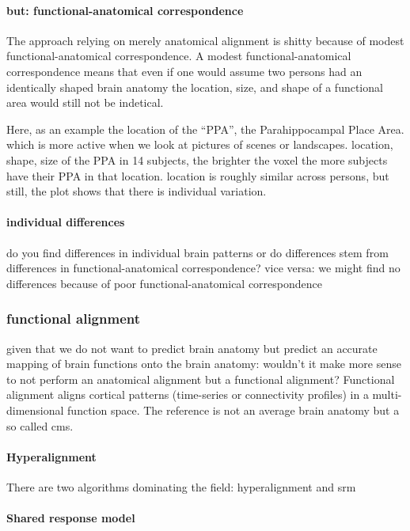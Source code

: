 \paragraph{but: functional-anatomical correspondence}
The approach relying on merely anatomical alignment is shitty because of modest
functional-anatomical correspondence.
A modest functional-anatomical correspondence means that even if one would assume
two persons had an identically shaped brain anatomy the location, size, and
shape of a functional area would still not be indetical.

Here, as an example the location of the ``PPA'', the Parahippocampal Place Area.
which is more active when we look at pictures of scenes or landscapes.
%
location, shape, size of the PPA in 14 subjects,
%
the brighter the voxel the more subjects have their PPA in that location.
%
location is roughly similar across persons, but still, the plot shows that there
is individual variation.


\paragraph{individual differences}
%
do you find differences in individual brain patterns or do differences stem from
differences in functional-anatomical correspondence?
%
vice versa: we might find no differences because of poor functional-anatomical
correspondence


\subsubsection{functional alignment}
%
given that we do not want to predict brain anatomy but predict an accurate
mapping of brain functions onto the brain anatomy:
%
wouldn't it make more sense to not perform an anatomical alignment but a
functional alignment?
%
Functional alignment aligns cortical patterns (time-series or connectivity
profiles) in a multi-dimensional function space.
The reference is not an average brain anatomy but a so called \ac{cms}.


\paragraph{Hyperalignment}
%
There are two algorithms dominating the field: hyperalignment and \ac{srm}


\paragraph{Shared response model}
%


